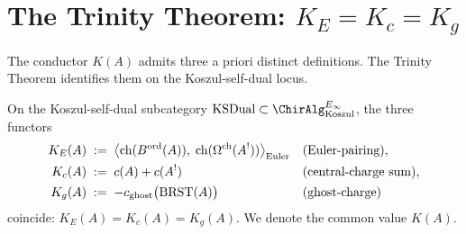\section{The Trinity Theorem: \(K_E = K_c = K_g\)}
\label{sec:climax-trinity}

The conductor \(K(A)\) admits three a priori distinct definitions. The
Trinity Theorem identifies them on the Koszul-self-dual locus.

\begin{theorem}
\label{thm:climax-trinity}
\ClaimStatusProvedHere
On the Koszul-self-dual subcategory
\(\KSDual \subset \ChirAlgInf_{\mathrm{Koszul}}\), the three functors
\begin{align*}
  K_{E}(A) &\;:=\; \bigl\langle \mathrm{ch}(B^{\mathrm{ord}}(A)),\;\mathrm{ch}(\Omega^{\mathrm{ch}}(A^{!}))\bigr\rangle_{\mathrm{Euler}}
    && \text{(Euler-pairing)},\\
  K_{c}(A) &\;:=\; c(A) + c(A^{!})
    && \text{(central-charge sum)},\\
  K_{g}(A) &\;:=\; -c_{\mathrm{ghost}}\bigl(\mathrm{BRST}(A)\bigr)
    && \text{(ghost-charge)}
\end{align*}
coincide: \(K_{E}(A) = K_{c}(A) = K_{g}(A)\). We denote the common
value \(K(A)\).
\end{theorem}

